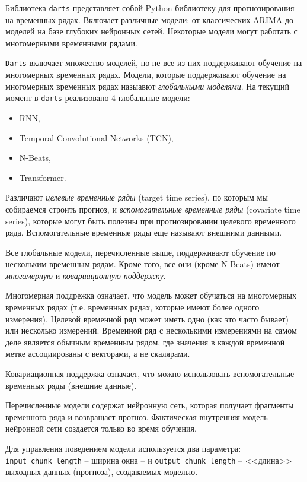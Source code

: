 \documentclass[%
	11pt,
	a4paper,
	utf8,
		]{article}
\begin{document}
Библиотека \texttt{darts} представляет собой Python-библиотеку для прогнозирования на временных рядах. Включает различные модели: от классических ARIMA до моделей на базе глубоких нейронных сетей. Некоторые модели могут работать с многомерными временными рядами.

\texttt{Darts} включает множество моделей, но не все из них поддерживают обучение на многомерных временных рядах. Модели, которые поддерживают обучение на многомерных временных рядах назыавют \emph{глобальными моделями}. На текущий момент в \texttt{darts} реализовано 4 глобальные модели:
\begin{itemize}
	\item RNN,
	
	\item Temporal Convolutional Networks (TCN),
	
	\item N-Beats,
	
	\item Transformer.
\end{itemize} 

Различают \emph{целевые временные ряды} (target time series), по которым мы собираемся строить прогноз, и \emph{вспомогательные временные ряды} (covariate time series), которые могут быть полезны при прогнозировании целевого временного ряда. Вспомогательные временные ряды еще называют внешними данными.

Все глобальные модели, перечисленные выше, поддерживают обучение по нескольким временным рядам. Кроме того, все они (кроме N-Beats) имеют \emph{многомерную} и \emph{ковариационную поддержку}.

Многомерная поддрежка означает, что модель может обучаться на многомерных временных рядах (т.е. временных рядах, которые имеют более одного измерения). Целевой временной ряд может иметь одно (как это часто бывает) или несколько измерений. Временной ряд с несколькими измерениями на самом деле является обычным временным рядом, где значения в каждой временной метке ассоциированы с векторами, а не скалярами.

Ковариационная поддержка означает, что можно использовать вспомогательные временных ряды (внешние данные).

Перечисленные модели содержат нейронную сеть, которая получает фрагменты временного ряда и возвращает прогноз. Фактическая внутренняя модель нейронной сети создается только во время обучения.

Для управления поведением модели используется два параметра: \texttt{input\_chunk\_length} -- ширина окна -- и \texttt{output\_chunk\_length} -- <<длина>> выходных данных (прогноза), создаваемых моделью. 
\end{document}
